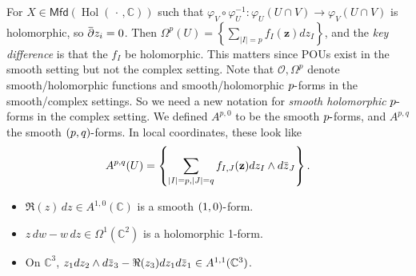 \begin{remark}

For
\(X \in {\mathsf{Mfd}}(\mathop{\mathrm{Hol}}({\,\cdot\,}, {\mathbb{C}}))\)
such that
\(\varphi_V \circ \varphi_U ^{-1} : \varphi_U( U \cap V) \to \varphi_V(U \cap V)\)
is holomorphic, so
\(\mkern 1.5mu\overline{\mkern-1.5mu{\partial}\mkern-1.5mu}\mkern 1.5muz_i = 0\).
Then
\(\Omega^p(U) = \left\{{ \sum_{{\left\lvert {I} \right\rvert} = p} f_I( \mathbf{z}) dz_I }\right\}\),
and the \emph{key difference} is that the \(f_I\) be holomorphic. This
matters since POUs exist in the smooth setting but not the complex
setting. Note that \({\mathcal{O}}, \Omega^p\) denote smooth/holomorphic
functions and smooth/holomorphic \(p{\hbox{-}}\)forms in the
smooth/complex settings. So we need a new notation for \emph{smooth
holomorphic} \(p{\hbox{-}}\)forms in the complex setting. We defined
\(A^{p, 0}\) to be the smooth \(p{\hbox{-}}\)forms, and \(A^{p, q}\) the
smooth \((p, q){\hbox{-}}\)forms. In local coordinates, these look like
\begin{align*}
A^{p, q}(U) = \left\{{ \sum_{{\left\lvert {I} \right\rvert} = p, {\left\lvert {J} \right\rvert} = q} f_{I, J} (\mathbf{z}) dz_I \wedge d\mkern 1.5mu\overline{\mkern-1.5muz\mkern-1.5mu}\mkern 1.5mu_J }\right\} 
.\end{align*}

\end{remark}

\begin{example}[?]

\envlist

\begin{itemize}
\tightlist
\item
  \(\Re(z) \,dz\in A^{1, 0}({\mathbb{C}})\) is a smooth
  \((1, 0){\hbox{-}}\)form.
\item
  \(z\,dw- w\,dz\in \Omega^1({\mathbb{C}}^2)\) is a holomorphic 1-form.
\item
  On \({\mathbb{C}}^3\),
  \(z_1 dz_2 \wedge d\mkern 1.5mu\overline{\mkern-1.5muz\mkern-1.5mu}\mkern 1.5mu_3 - \Re(z_3) dz_1 d\mkern 1.5mu\overline{\mkern-1.5muz\mkern-1.5mu}\mkern 1.5mu_1 \in A^{1, 1}({\mathbb{C}}^3)\).
\end{itemize}

\end{example}


